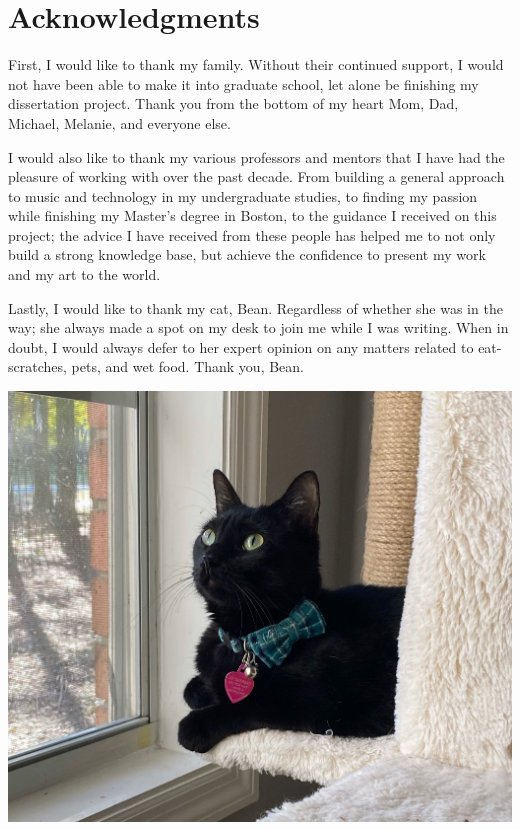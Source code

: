 

\chapter{Acknowledgments}

First, I would like to thank my family. Without their continued support, I would not have been able to make it into graduate school, let alone be finishing my dissertation project. Thank you from the bottom of my heart Mom, Dad, Michael, Melanie, and everyone else. 

I would also like to thank my various professors and mentors that I have had the pleasure of working with over the past decade. From building a general approach to music and technology in my undergraduate studies, to finding my passion while finishing my Master’s degree in Boston, to the guidance I received on this project; the advice I have received from these people has helped me to not only build a strong knowledge base, but achieve the confidence to present my work and my art to the world.

Lastly, I would like to thank my cat, Bean. Regardless of whether she was in the way; she always made a spot on my desk to join me while I was writing. When in doubt, I would always defer to her expert opinion on any matters related to eat-scratches, pets, and wet food. Thank you, Bean.

\vspace{10mm}

\begin{center}
    \includegraphics[scale=0.12]{bean.jpeg}
\end{center}



